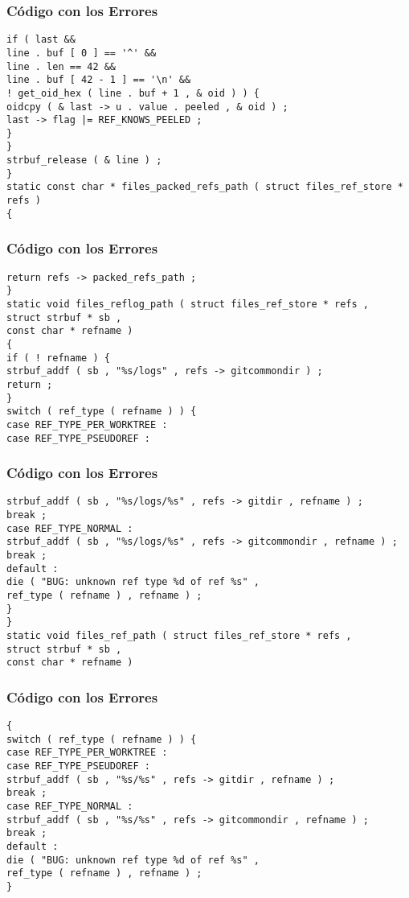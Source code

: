 \documentclass{beamer}
\begin{document}
\begin{frame}[fragile]
\frametitle{C\'odigo con los Errores}
\begin{verbatim}
if ( last && 
line . buf [ 0 ] == '^' && 
line . len == 42 && 
line . buf [ 42 - 1 ] == '\n' && 
! get_oid_hex ( line . buf + 1 , & oid ) ) { 
oidcpy ( & last -> u . value . peeled , & oid ) ; 
last -> flag |= REF_KNOWS_PEELED ; 
} 
} 
strbuf_release ( & line ) ; 
} 
static const char * files_packed_refs_path ( struct files_ref_store * refs ) 
{ 
\end{verbatim}
\end{frame}
\begin{frame}[fragile]
\frametitle{C\'odigo con los Errores}
\begin{verbatim}
return refs -> packed_refs_path ; 
} 
static void files_reflog_path ( struct files_ref_store * refs , 
struct strbuf * sb , 
const char * refname ) 
{ 
if ( ! refname ) { 
strbuf_addf ( sb , "%s/logs" , refs -> gitcommondir ) ; 
return ; 
} 
switch ( ref_type ( refname ) ) { 
case REF_TYPE_PER_WORKTREE : 
case REF_TYPE_PSEUDOREF : 
\end{verbatim}
\end{frame}
\begin{frame}[fragile]
\frametitle{C\'odigo con los Errores}
\begin{verbatim}
strbuf_addf ( sb , "%s/logs/%s" , refs -> gitdir , refname ) ; 
break ; 
case REF_TYPE_NORMAL : 
strbuf_addf ( sb , "%s/logs/%s" , refs -> gitcommondir , refname ) ; 
break ; 
default : 
die ( "BUG: unknown ref type %d of ref %s" , 
ref_type ( refname ) , refname ) ; 
} 
} 
static void files_ref_path ( struct files_ref_store * refs , 
struct strbuf * sb , 
const char * refname ) 
\end{verbatim}
\end{frame}
\begin{frame}[fragile]
\frametitle{C\'odigo con los Errores}
\begin{verbatim}
{ 
switch ( ref_type ( refname ) ) { 
case REF_TYPE_PER_WORKTREE : 
case REF_TYPE_PSEUDOREF : 
strbuf_addf ( sb , "%s/%s" , refs -> gitdir , refname ) ; 
break ; 
case REF_TYPE_NORMAL : 
strbuf_addf ( sb , "%s/%s" , refs -> gitcommondir , refname ) ; 
break ; 
default : 
die ( "BUG: unknown ref type %d of ref %s" , 
ref_type ( refname ) , refname ) ; 
} 
\end{verbatim}
\end{frame}
\end{document}
